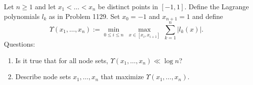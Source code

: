 Let $n\ge 1$ and let $x_1<\dots<x_n$ be distinct points in $[-1,1]$.
Define the Lagrange polynomials $l_k$ as in Problem 1129.
Set $x_0=-1$ and $x_{n+1}=1$ and define
\[
\Upsilon(x_1,\dots,x_n):=\min_{0\le i\le n}\ \max_{x\in[x_i,x_{i+1}]}\ \sum_{k=1}^n |l_k(x)|.
\]
Questions:
\begin{enumerate}
\item Is it true that for all node sets, $\Upsilon(x_1,\dots,x_n)\ll \log n$?
\item Describe node sets $x_1,\dots,x_n$ that maximize $\Upsilon(x_1,\dots,x_n)$.
\end{enumerate}
